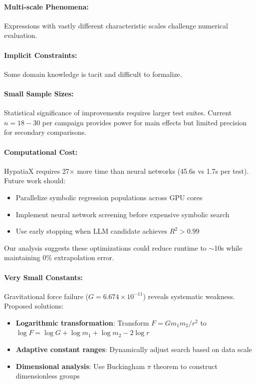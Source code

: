 \documentclass[twoside,11pt]{article}
\begin{document}
\paragraph{Multi-scale Phenomena:} Expressions with vastly different characteristic scales challenge numerical evaluation.

\paragraph{Implicit Constraints:} Some domain knowledge is tacit and difficult to formalize.

\paragraph{Small Sample Sizes:} Statistical significance of improvements requires larger test suites. Current $n = 18-30$ per campaign provides power for main effects but limited precision for secondary comparisons.


\paragraph{Computational Cost:} HypatiaX requires 27$\times$ more time than neural networks (45.6s vs 1.7s per test). Future work should:
\begin{itemize}
\item Parallelize symbolic regression populations across GPU cores
\item Implement neural network screening before expensive symbolic search
\item Use early stopping when LLM candidate achieves $R^2 > 0.99$
\end{itemize}

Our analysis suggests these optimizations could reduce runtime to $\sim$10s while maintaining 0\% extrapolation error.

\paragraph{Very Small Constants:} Gravitational force failure ($G = 6.674 \times 10^{-11}$) reveals systematic weakness. Proposed solutions:
\begin{itemize}
\item \textbf{Logarithmic transformation}: Transform $F = Gm_1m_2/r^2$ to $\log F = \log G + \log m_1 + \log m_2 - 2\log r$
\item \textbf{Adaptive constant ranges}: Dynamically adjust search based on data scale
\item \textbf{Dimensional analysis}: Use Buckingham $\pi$ theorem to construct dimensionless groups
\end{itemize}
\end{document}
